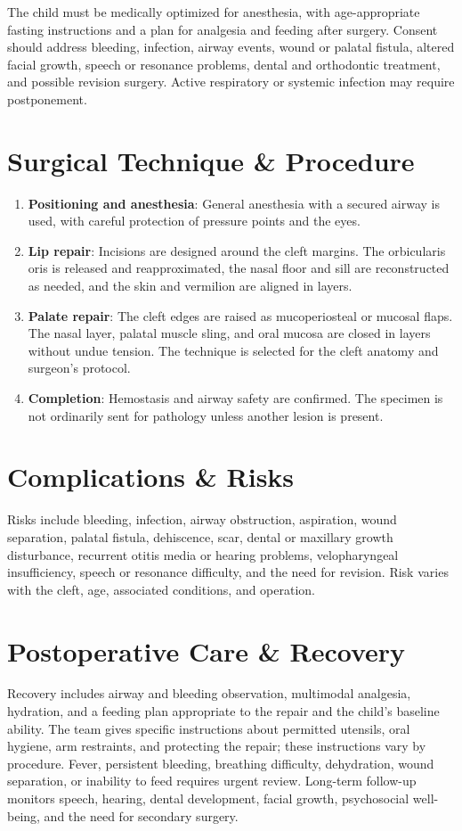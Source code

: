 The child must be medically optimized for anesthesia, with age-appropriate fasting instructions and a plan for analgesia and feeding after surgery. Consent should address bleeding, infection, airway events, wound or palatal fistula, altered facial growth, speech or resonance problems, dental and orthodontic treatment, and possible revision surgery. Active respiratory or systemic infection may require postponement.

\section*{Surgical Technique \& Procedure}
\begin{enumerate}
  \item \textbf{Positioning and anesthesia}: General anesthesia with a secured airway is used, with careful protection of pressure points and the eyes.
  \item \textbf{Lip repair}: Incisions are designed around the cleft margins. The orbicularis oris is released and reapproximated, the nasal floor and sill are reconstructed as needed, and the skin and vermilion are aligned in layers.
  \item \textbf{Palate repair}: The cleft edges are raised as mucoperiosteal or mucosal flaps. The nasal layer, palatal muscle sling, and oral mucosa are closed in layers without undue tension. The technique is selected for the cleft anatomy and surgeon's protocol.
  \item \textbf{Completion}: Hemostasis and airway safety are confirmed. The specimen is not ordinarily sent for pathology unless another lesion is present.
\end{enumerate}

\section*{Complications \& Risks}
Risks include bleeding, infection, airway obstruction, aspiration, wound separation, palatal fistula, dehiscence, scar, dental or maxillary growth disturbance, recurrent otitis media or hearing problems, velopharyngeal insufficiency, speech or resonance difficulty, and the need for revision. Risk varies with the cleft, age, associated conditions, and operation.

\section*{Postoperative Care \& Recovery}
Recovery includes airway and bleeding observation, multimodal analgesia, hydration, and a feeding plan appropriate to the repair and the child's baseline ability. The team gives specific instructions about permitted utensils, oral hygiene, arm restraints, and protecting the repair; these instructions vary by procedure. Fever, persistent bleeding, breathing difficulty, dehydration, wound separation, or inability to feed requires urgent review. Long-term follow-up monitors speech, hearing, dental development, facial growth, psychosocial well-being, and the need for secondary surgery.

